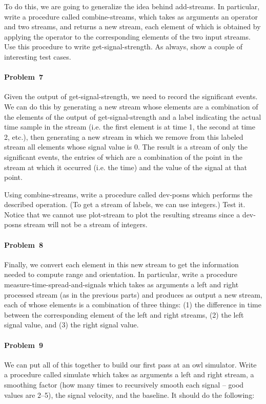 To do this, we are going to generalize the idea behind {\cf
add-streams}.  In particular, write a procedure called {\cf
combine-streams}, which takes as arguments an operator and two
streams, and returns a new stream, each element of which is obtained
by applying the operator to the corresponding elements of the two
input streams.  Use this procedure to write {\cf get-signal-strength}. 
As always, show a couple of interesting test cases.


\paragraph{Problem~7}  Given the output of {\cf get-signal-strength}, we
need to record the significant events.  We can do this by generating a
new stream whose elements are a combination of the elements of the
output of {\cf get-signal-strength} and a label indicating the actual
time sample in the stream (i.e. the first element is at time 1, the
second at time 2, etc.), then generating a new stream in which we remove from
this labeled stream all elements whose signal value is 0.  The result is a
stream of only the significant events, the entries of which are a
combination of the point in the stream at which it occurred (i.e. the
time) and the value of the signal at that point.

Using {\cf combine-streams}, write
a procedure called {\cf dev-posns} which performs the described operation.
(To get a stream of
labels, we can use {\cf integers}.) Test it. Notice that we cannot use {\cf
plot-stream} to plot the resulting streams since a {\cf dev-posns} stream will
not be a stream of integers.

\paragraph{Problem~8}  Finally, we convert each element in this new stream
to get the information needed to compute range and orientation.  In
particular, write a procedure {\cf measure-time-spread-and-signals}
which takes as arguments a left and right processed stream (as in the
previous parts) and produces as output a new stream, each of whose
elements is a combination of three things: (1) the difference in time between
the corresponding element of the left and right streams, (2) the left signal
value, and (3) the right signal value.


\paragraph{Problem~9}  We can put all of this together to build our first
pass at an owl simulator.  Write a procedure called {\cf simulate} which
takes as arguments a left and right stream, a smoothing
factor (how many
times to recursively smooth each signal -- good values are 2--5), the signal
velocity, and the baseline. It should do the following:

